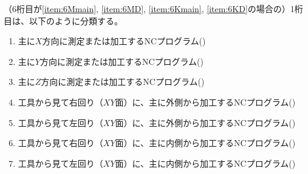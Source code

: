 \clearpage
（6桁目が\ref{item:6Mmain}, \ref{item:6MD}, \ref{item:6Kmain}, \ref{item:6KD}\hx の場合の）1桁目は、以下のように分類する。
\begin{enumerate}[label=\arabic*.]
\item 主に$X$方向に測定または加工するNCプログラム({})
\item 主に$Y$方向に測定または加工するNCプログラム({})
\item 主に$Z$方向に測定または加工するNCプログラム({})
\item 工具から見て右回り（$XY$面）に、主に外側から加工するNCプログラム({})
\item 工具から見て左回り（$XY$面）に、主に外側から加工するNCプログラム({})
\item 工具から見て右回り（$XY$面）に、主に内側から加工するNCプログラム({})
\item 工具から見て左回り（$XY$面）に、主に内側から加工するNCプログラム({})
\end{enumerate}
